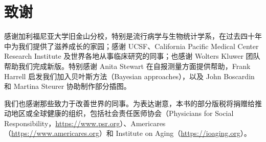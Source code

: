 \chapter*{致谢}
感谢加利福尼亚大学旧金山分校，特别是流行病学与生物统计学系，在过去四十年中为我们提供了滋养成长的家园；感谢 UCSF、California Pacific Medical Center Research Institute 及世界各地从事临床研究的同事；也感谢 Wolters Kluwer 团队帮助我们完成新版。特别感谢 Anita Stewart 在自报测量方面提供帮助，Frank Harrell 启发我们加入贝叶斯方法（Bayesian approaches），以及 John Boscardin 和 Martina Steurer 协助制作部分插图。

我们也感谢那些致力于改善世界的同事。为表达谢意，本书的部分版税将捐赠给推动地区或全球健康的组织，包括社会责任医师协会（Physicians for Social Responsibility，\url{https://www.psr.org}）、Americares（\url{https://www.americares.org}）和 Institute on Aging（\url{https://ioaging.org}）。
